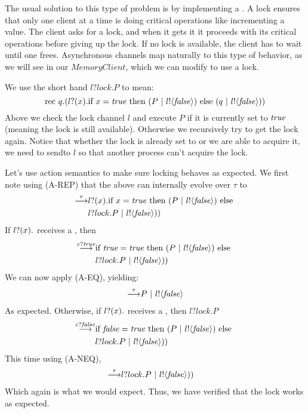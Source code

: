 The usual solution to this type of problem is by implementing a .  
A lock ensures that only one client at a time is doing critical operations like incrementing a value.  
The client asks for a lock, and when it gets it it proceeds with its critical operations before giving up the lock.  
If no lock is available, the client has to wait until one frees.  
Asynchronous channels map naturally to this type of behavior, as we will see in our $MemoryClient$, which we can modify to use a lock.  

We use the short hand $l?lock.P$ to mean:
\[
	\text{rec }{q}.({l}?({x}). \text{if } {x= \ensuremath{\text{\emph{true}}} }\text{ then } (P\ |\  {l}!\langle{ \ensuremath{\text{\emph{false}}} }\rangle)\text{ else }(q \ |\  {l}!\langle{ \ensuremath{\text{\emph{false}}} }\rangle))
\]
Above we check the lock channel $l$ and execute $P$ if it is currently set to $\text{\emph{true}}$ (meaning the lock is still available). 
Otherwise we recursively try to get the lock again.
Notice that whether the lock is already set to \pfalse or we are able to acquire it, we need to send\pfalse to $l$ so that another process can't acquire the lock.

Let's use action semantics to make sure locking behaves as expected.  
We first note using (A-REP) that the above can internally evolve over $\tau$ to
\begin{equation}\begin{split}
	\overset{{\tau}}{\longrightarrow} & {l}?({x}). \text{if } {x= \ensuremath{\text{\emph{true}}} }\text{ then }(P\ |\  {l}!\langle{ \ensuremath{\text{\emph{false}}} }\rangle)\text{ else }\\
	&l?lock.P \ |\  {l}!\langle{ \ensuremath{\text{\emph{false}}} }\rangle))
\end{split}\end{equation}
If ${l}?({x}).$ receives a \ptrue, then
\begin{equation}\begin{split}
	\overset{{{c}?{\text{\emph{true}}}}}{\longrightarrow} & \text{if } { \ensuremath{\text{\emph{true}}} = \ensuremath{\text{\emph{true}}} }\text{ then }(P\ |\  {l}!\langle{ \ensuremath{\text{\emph{false}}} }\rangle)\text{ else }\\
	&l?lock.P \ |\  {l}!\langle{ \ensuremath{\text{\emph{false}}} }\rangle))
\end{split}\end{equation}
We can now apply (A-EQ), yielding:
\begin{equation}\begin{split}
	\overset{{\tau}}{\longrightarrow} & P\ |\  {l}!\langle{ \ensuremath{\text{\emph{false}}} }\rangle\\
\end{split}\end{equation}
As expected.  Otherwise, if ${l}?({x}).$ receives a \pfalse, then $l?lock.P$
\begin{equation}\begin{split}
	\overset{{{c}?{\text{\emph{false}}}}}{\longrightarrow} & \text{if } { \ensuremath{\text{\emph{false}}} = \ensuremath{\text{\emph{true}}} }\text{ then }(P\ |\  {l}!\langle{ \ensuremath{\text{\emph{false}}} }\rangle)\text{ else }\\
	&l?lock.P \ |\  {l}!\langle{ \ensuremath{\text{\emph{false}}} }\rangle))
\end{split}\end{equation}
This time using (A-NEQ),
\begin{equation}\begin{split}
	\overset{{\tau}}{\longrightarrow} &l?lock.P \ |\  {l}!\langle{ \ensuremath{\text{\emph{false}}} }\rangle))
\end{split}\end{equation}
Which again is what we would expect.  
Thus, we have verified that the lock works as expected.

